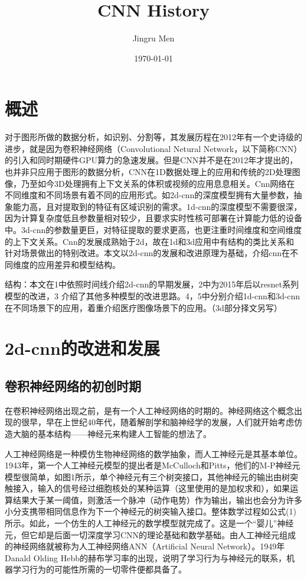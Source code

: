 \documentclass[15pt]{article}
\title{CNN History}
\author{Jingru Men}
\date{\today}
\begin{document}
\maketitle
\tableofcontents
\newpage
\section{概述}
对于图形所做的数据分析，如识别、分割等，其发展历程在2012年有一个史诗级的进步，就是因为卷积神经网络（Convolutional Netural Network，以下简称CNN）的引入和同时期硬件GPU算力的急速发展。但是CNN并不是在2012年才提出的，也并非只应用于图形的数据分析，CNN在1D数据处理上的应用和传统的2D处理图像，乃至如今3D处理拥有上下文关系的体积或视频的应用息息相关。Cnn网络在不同维度和不同场景有着不同的应用形式。如2d-cnn的深度模型拥有大量参数，抽象能力高，且对提取到的特征有区域识别的需求。1d-cnn的深度模型不需要很深，因为计算复杂度低且参数量相对较少，且要求实时性核可部署在计算能力低的设备中。3d-cnn的参数量更巨，对特征提取的要求更高，也更注重时间维度和空间维度的上下文关系。Cnn的发展成熟始于2d，故在1d和3d应用中有结构的类比关系和针对场景做出的特别改进。本文以2d-cnn的发展和改进原理为基础，介绍cnn在不同维度的应用差异和模型结构。

结构：本文在1中依照时间线介绍2d-cnn的早期发展，2中为2015年后以resnet系列模型的改进，3 介绍了其他多种模型的改进思路。4，5中分别介绍1d-cnn和3d-cnn在不同场景下的应用，着重介绍医疗图像场景下的应用。（3d部分择文另写） 

\section{2d-cnn的改进和发展}
\subsection{卷积神经网络的初创时期}
在卷积神经网络出现之前，是有一个人工神经网络的时期的。神经网络这个概念出现的很早，早在上世纪40年代，随着解剖学和脑神经学的发展，人们就开始考虑仿造大脑的基本结构——神经元来构建人工智能的想法了。

人工神经网络是一种模仿生物神经网络的数学抽象，而人工神经元是其基本单位。1943年，第一个人工神经元模型的提出者是McCulloch和Pitts\cite{ref1}，他们的M-P神经元模型很简单，如图1所示，单个神经元有三个树突接口\cite{ref2}，其他神经元的输出由树突触接入，输入的信号经过细胞核处的某种运算（这里使用的是加权求和），如果运算结果大于某一阈值，则激活一个脉冲（动作电势）作为输出，输出也会分为许多小分支携带相同信息作为下一个神经元的树突输入接口。整体数学过程如公式(1)所示。如此，一个仿生的人工神经元的数学模型就完成了。这是一个“婴儿”神经元，但它却是后面一切深度学习CNN的理论基础和数学基础。由人工神经元组成的神经网络就被称为人工神经网络ANN（Artificial Neural Network）。1949年Danald Olding Hebb的赫布学习率的出现，说明了学习行为与神经元的联系，机器学习行为的可能性所需的一切零件便都具备了。
\end{document}
